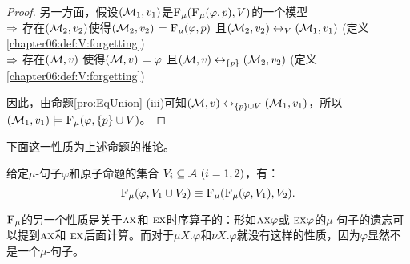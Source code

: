 \begin{proof}
	另一方面，假设$({\cal M}_1,v_1)$是${\textsc{F}_{\textsc{$\mu$}}}({\textsc{F}_{\textsc{$\mu$}}}(\varphi, p), V)$的一个模型\\
	$\Rightarrow$ 存在$({\cal M}_2,v_2)$使得$({\cal M}_2,v_2) \models  {\textsc{F}_{\textsc{$\mu$}}}(\varphi, p)$ 且$({\cal M}_2,v_2) \leftrightarrow_V ({\cal M}_1,v_1)$ \hfill(定义\ref{chapter06:def:V:forgetting})\\
	$\Rightarrow$ 存在$({\cal M},v)$ 使得$({\cal M},v) \models \varphi$ 且$({\cal M},v) \leftrightarrow_{\{p\}} ({\cal M}_2,v_2)$ \hfill(定义\ref{chapter06:def:V:forgetting}) 
	
	因此，由命题\ref{pro:EqUnion} (iii)可知$({\cal M},v) \leftrightarrow_{\{p\} \cup V} ({\cal M}_1,v_1)$，所以$({\cal M}_1,v_1) \models {\textsc{F}_{\textsc{$\mu$}}}(\varphi, \{p\} \cup V)$。
\end{proof}


下面这一性质为上述命题的推论。

\begin{corollary}[切片性]\label{chapter06:disTFV}
	给定$\mu$-句子$\varphi$和原子命题的集合 $V_i\subseteq{\cal A}~(i=1,2)$，有：
	\[
	{\textsc{F}_{\textsc{$\mu$}}}(\varphi, V_1 \cup V_2) \equiv {\textsc{F}_{\textsc{$\mu$}}}({\textsc{F}_{\textsc{$\mu$}}}(\varphi, V_1), V_2).
	\]
\end{corollary}

${\textsc{F}_{\textsc{$\mu$}}}$的另一个性质是关于$\textsc{a}\textsc{x}$和 $\textsc{e} \textsc{x}$时序算子的：形如$\textsc{a}\textsc{x} \varphi$或 $\textsc{e} \textsc{x} \varphi$的$\mu$-句子的遗忘可以提到$\textsc{a}\textsc{x}$和 $\textsc{e} \textsc{x}$后面计算。而对于$\mu X. \varphi$和$\nu X. \varphi$就没有这样的性质，因为$\varphi$显然不是一个$\mu$-句子。


